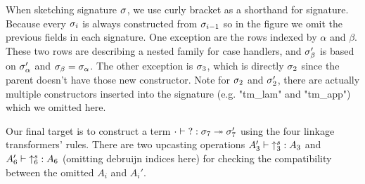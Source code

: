 When sketching signature $\sigma$, we use curly bracket as a shorthand for signature. Because every $\sigma_i$ is always constructed from $\sigma_{i-1}$ so in the figure we omit the previous fields in each signature.  One exception are the rows indexed by $\alpha$ and $\beta$. These two rows are describing a nested family for case handlers, and $\sigma_\beta'$ is based on $\sigma_\alpha'$ and $\sigma_\beta = \sigma_\alpha$. The other exception is $\sigma_3$, which is directly $\sigma_2$ since the parent doesn't have those new constructor. Note for $\sigma_2$ and $\sigma_2'$, there are actually multiple constructors inserted into the signature (e.g. "tm_lam" and "tm_app") which we omitted here.


Our final target is to construct a term $ {\cdot} \vdash {?} : {\sigma_7} \twoheadrightarrow {\ensuremath{\sigma}_7'}$ using the four linkage transformers' rules. There are two upcasting operations $ {A_3'} \vdash {\uparrow^s_3} : {A_3} $ and $ {A_6'} \vdash {\uparrow^s_6} : {A_6} $ (omitting debruijn indices here) for checking the compatibility between the omitted $A_i$ and $A_i'$.

\fi